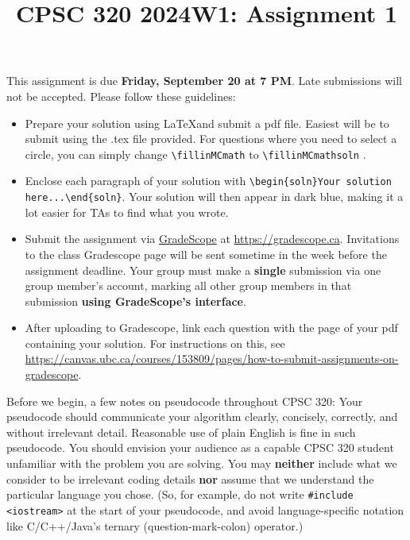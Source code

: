 \documentclass[11pt,fleqn]{exam}
\author{}
\date{}
\title{CPSC 320 2024W1: Assignment 1}
\newcommand{\fillinMCmath}[1]{\begin{tikzpicture}\draw circle [radius=0.5em];\end{tikzpicture}\ #1}
\newcommand{\fillinMCmathsoln}[1]{\begin{tikzpicture}\draw[black, fill=blue] circle [radius=0.5em];\end{tikzpicture}\ #1}
\newenvironment{soln}{\color{solnblue}}{}
\begin{document}
	
	\maketitle
	\vspace{-0.5in} This assignment is due \textbf{Friday, September 20 at 7 PM}. Late submissions will not be accepted. Please follow these guidelines:
	\begin{itemize}
		\item Prepare your  solution using \LaTeX and submit  a pdf file. Easiest will be to submit using
		the .tex file provided. For questions where you  need to select a circle, you can simply
		change \verb~\fillinMCmath~ to \verb~\fillinMCmathsoln~ .
		
		\item Enclose each paragraph of your solution with
		\verb~\begin{soln}Your solution here...\end{soln}~.
		\begin{soln}Your  solution will  then appear  in dark  blue\end{soln}, making  it a  lot
		easier for TAs to find what you wrote.
		
		\item   Submit   the    assignment   via   \href{https://gradescope.ca/}{GradeScope}   at
		\url{https://gradescope.ca}. Invitations to the class Gradescope page will be sent sometime in the week before the assignment deadline. Your group must make  a \textbf{single} submission via one
		group member's account, marking all other group members in that submission \textbf{using
			GradeScope's interface}.
		
		\item  After uploading  to  Gradescope, link  each  question  with the  page  of your  pdf
		containing your solution. For instructions on this,
		see \\ \url{https://canvas.ubc.ca/courses/153809/pages/how-to-submit-assignments-on-gradescope}.
	\end{itemize}
	
	Before we  begin, a few  notes on pseudocode throughout  CPSC 320: Your  pseudocode should
	communicate your algorithm  clearly, concisely, correctly, and  without irrelevant detail.
	Reasonable use  of plain  English is  fine in  such pseudocode.  You should  envision your
	audience as a capable CPSC 320 student unfamiliar with the problem you are solving. You may \textbf{neither} include what we consider to be irrelevant coding details \textbf{nor} assume that  we understand the particular  language you
	chose. (So, for example,  do not write \texttt{\#include <iostream>} at  the start of your
	pseudocode,   and    avoid   language-specific   notation   like    C/C++/Java's   ternary
	(question-mark-colon) operator.)
	
\end{document}
